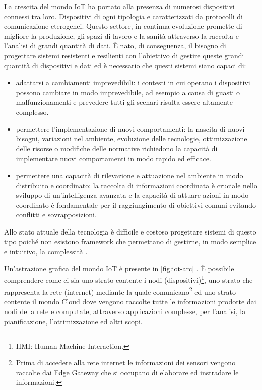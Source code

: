 \documentclass[12pt,a4paper,openright,twoside]{book}
\begin{document}
La crescita del mondo \ac{IoT} ha portato alla presenza di numerosi dispositivi connessi tra loro. Dispositivi di ogni tipologia e caratterizzati da protocolli di comunicazione eterogenei. Questo settore, in continua evoluzione promette di migliore la produzione, gli spazi di lavoro e la sanità attraverso la raccolta e l'analisi di grandi quantità di dati. È nato, di conseguenza, il bisogno di progettare sistemi resistenti e resilienti con l'obiettivo di gestire queste grandi quantità di dispositivi e dati ed è necessario che questi sistemi siano capaci di: 
\begin{itemize}
    \item adattarsi a cambiamenti imprevedibili: i contesti in cui operano i dispositivi possono cambiare in modo imprevedibile, ad esempio a causa di guasti o malfunzionamenti e prevedere tutti gli scenari risulta essere altamente complesso. 
    \item permettere l'implementazione di nuovi comportamenti: la nascita di nuovi bisogni, variazioni nel ambiente, evoluzione delle tecnologie, ottimizzazione delle risorse o modifiche delle normative richiedono la capacità di implementare nuovi comportamenti in modo rapido ed efficace. 
    \item permettere una capacità di rilevazione e attuazione nel ambiente in modo distribuito e coordinato: la raccolta di informazioni coordinata è cruciale nello sviluppo di un'intelligenza avanzata e la capacità di attuare azioni in modo coordinato è fondamentale per il raggiungimento di obiettivi comuni evitando conflitti e sovrapposizioni. 
\end{itemize}

Allo stato attuale della tecnologia è difficile e costoso progettare sistemi di questo tipo poiché non esistono framework che permettano di gestirne, in modo semplice e intuitivo, la complessità \cite{Beal2015} \cite{CasadeiPhDThesis}.

Un'astrazione grafica del mondo IoT è presente in \cref{fig:iot-arc} \cite{Testa2022}. È possibile comprendere come ci sia uno strato contente i nodi (dispositivi)\footnote{HMI: Human-Machine-Interaction.}, uno strato che rappresenta la rete (internet) mediante la quale comunicano\footnote{Prima di accedere alla rete internet le informazioni dei sensori vengono raccolte dai Edge Gateway che si occupano di elaborare ed instradare le informazioni.} ed uno strato contente il mondo Cloud dove vengono raccolte tutte le informazioni prodotte dai nodi della rete e computate, attraverso applicazioni complesse, per l'analisi, la pianificazione, l'ottimizzazione ed altri scopi.
\end{document}
